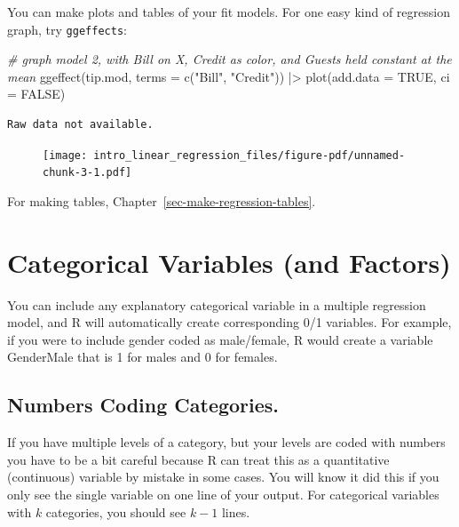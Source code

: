 \documentclass[
  letterpaper,
  DIV=11,
  numbers=noendperiod]{scrreprt}
\newenvironment{Shaded}{\begin{snugshade}}{\end{snugshade}}
\newcommand{\AttributeTok}[1]{\textcolor[rgb]{0.49,0.56,0.16}{#1}}
\newcommand{\CommentTok}[1]{\textcolor[rgb]{0.38,0.63,0.69}{\textit{#1}}}
\newcommand{\ConstantTok}[1]{\textcolor[rgb]{0.53,0.00,0.00}{#1}}
\newcommand{\FunctionTok}[1]{\textcolor[rgb]{0.02,0.16,0.49}{#1}}
\newcommand{\NormalTok}[1]{\textcolor[rgb]{0.00,0.44,0.13}{#1}}
\newcommand{\SpecialCharTok}[1]{\textcolor[rgb]{0.25,0.44,0.63}{#1}}
\newcommand{\StringTok}[1]{\textcolor[rgb]{0.25,0.44,0.63}{#1}}
\begin{document}
You can make plots and tables of your fit models. For one easy kind of
regression graph, try \texttt{ggeffects}:

\begin{Shaded}
\begin{Highlighting}[]
\CommentTok{\# graph model 2, with Bill on X, Credit as color, and Guests held constant at the mean}
\FunctionTok{ggeffect}\NormalTok{(tip.mod, }\AttributeTok{terms =} \FunctionTok{c}\NormalTok{(}\StringTok{"Bill"}\NormalTok{, }\StringTok{"Credit"}\NormalTok{)) }\SpecialCharTok{|\textgreater{}} 
  \FunctionTok{plot}\NormalTok{(}\AttributeTok{add.data =} \ConstantTok{TRUE}\NormalTok{, }\AttributeTok{ci =} \ConstantTok{FALSE}\NormalTok{)}
\end{Highlighting}
\end{Shaded}

\begin{verbatim}
Raw data not available.
\end{verbatim}

\begin{figure}[H]

{\centering \texttt{[image: intro\_linear\_regression\_files/figure-pdf/unnamed-chunk-3-1.pdf]}

}

\end{figure}

For making tables, Chapter~\ref{sec-make-regression-tables}.

\hypertarget{categorical-variables-and-factors}{%
\section{Categorical Variables (and
Factors)}\label{categorical-variables-and-factors}}

You can include any explanatory categorical variable in a multiple
regression model, and R will automatically create corresponding 0/1
variables. For example, if you were to include gender coded as
male/female, R would create a variable GenderMale that is 1 for males
and 0 for females.

\hypertarget{numbers-coding-categories.}{%
\subsection{Numbers Coding
Categories.}\label{numbers-coding-categories.}}

If you have multiple levels of a category, but your levels are coded
with numbers you have to be a bit careful because R can treat this as a
quantitative (continuous) variable by mistake in some cases. You will
know it did this if you only see the single variable on one line of your
output. For categorical variables with \(k\) categories, you should see
\(k-1\) lines.
\end{document}
